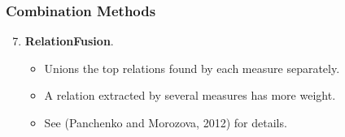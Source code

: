 \documentclass{beamer}
\begin{document}
\begin{frame}
\frametitle{Combination Methods}

\begin{enumerate}
  \setcounter{enumi}{6}
  \item \textbf{RelationFusion}. 
  \begin{itemize}
  \item Unions the top relations found by each measure separately.
  \item A relation extracted by several measures has more weight.
  \item See (Panchenko and Morozova, 2012) for details. 
\end{itemize}


\end{enumerate}

\end{frame}
\end{document}
